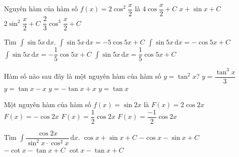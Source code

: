 \begin{ex}%
	Nguyên hàm của hàm  số $f(x)=2\cos^2\dfrac{x}{2}$ là
	 \choice
		{$4\cos  \dfrac{x}{2}+C$}
		{\True $x+\sin  x+C$}
		{$2\sin^2\dfrac{x}{2}+C$} 
		 {$\dfrac{2}{3}\cos^3\dfrac{x}{2}+C$}
\end{ex}

\begin{ex}%
	 Tìm $\displaystyle \int \sin 5x \mathrm{\,d}x$.
	 \choice
		{$\displaystyle \int \sin 5x \mathrm{\,d}x=-5\cos 5x+C$} 
		 {$\displaystyle \int \sin 5x \mathrm{\,d}x=-\cos 5x+C$}
		{\True $\displaystyle \int \sin  5x \mathrm{\,d}x=-\dfrac{1}{5}\cos 5x+C$}
		{$\displaystyle \int \sin 5x \mathrm{\,d}x=\dfrac{1}{5}\cos 5x+C$} 
\end{ex}

\begin{ex}%
	Hàm số nào sau đây là một nguyên  hàm của hàm số $ y=\tan ^2x$?
	 \choice
		 {$y=\dfrac{\tan^3x}{3}$}
		{\True $y=\tan  x-x$}
		 {$y=-\tan x+x$}
		 {$y=\tan x$}
\end{ex}

\begin{ex}%
	Một nguyên hàm của hàm số $f(x)  =\sin2x$ là
	 \choice
		{$F(x)=2\cos2x$} 
		{$F(x)=-\cos  2x$}
		 {$F(x)= \dfrac{1}{2}\cos 2x $}
		{$F(x)= \dfrac{-1}{2}\cos 2x $} 
\end{ex}

\begin{ex}%
	Tìm $\displaystyle \int \dfrac{\cos  2x}{\sin^2 x\cdot \cos^2 x} \mathrm{\,d}x$.
	 \choice
		 {$\cos x+\sin x+C$}
		{$-\cos x-\sin x+C$} 
		{\True  $-\cot x-\tan x+C$}
		 {$\cot x-\tan x+C$}
\end{ex}

